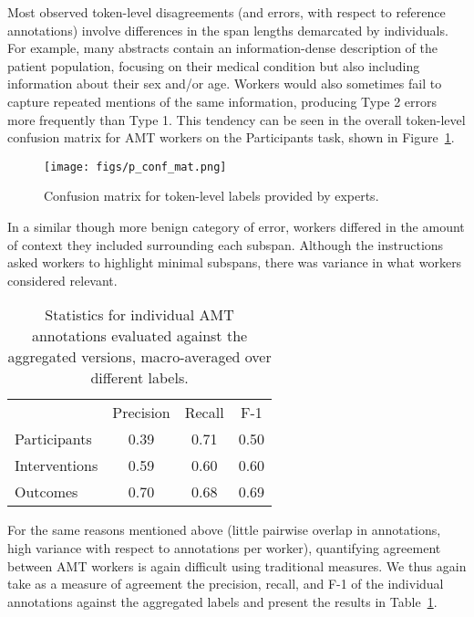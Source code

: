 \documentclass[11pt,a4paper]{article}
\begin{document}
Most observed token-level disagreements (and errors, with respect to reference annotations) involve differences in the span lengths demarcated by individuals. 
For example, many abstracts contain an information-dense description of the patient population, focusing on their medical condition but also including information about their sex and/or age.
Workers would also sometimes fail to capture repeated mentions of the same information, producing Type 2 errors more frequently than Type 1.
This tendency can be seen in the overall token-level confusion matrix for AMT workers on the Participants task, shown in Figure~\ref{fig:p_confusion}. 

\begin{figure}
\centering
\texttt{[image: figs/p\_conf\_mat.png]}
\caption{Confusion matrix for token-level labels provided by experts.}
\label{fig:p_confusion}
\end{figure}

In a similar though more benign category of error, workers differed in the amount of context they included surrounding each subspan.
Although the instructions asked workers to highlight minimal subspans, there was variance in what workers considered relevant.

\begin{table}[h]\centering
    \small
    \begin{tabular}{ l c c c } 
\textbf{} & Precision & Recall & F-1 \\
        \cline{2-4}
        Participants  & 0.39 & 0.71 & 0.50 \\
        Interventions & 0.59 & 0.60 & 0.60 \\ 
        Outcomes      & 0.70 & 0.68 & 0.69 \\ 
\end{tabular}
    \caption{Statistics for individual AMT annotations evaluated against the aggregated versions, macro-averaged over different labels.}
   	\label{tab:amt_semantic_stats}
\end{table}

For the same reasons mentioned above (little pairwise overlap in annotations, high variance with respect to annotations per worker), quantifying agreement between AMT workers is again difficult using traditional measures. We thus again take as a measure of agreement the precision, recall, and F-1 of the individual annotations against the aggregated labels and present the results in Table~\ref{tab:amt_semantic_stats}.
\end{document}
